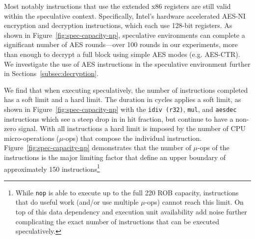 % 

Most notably instructions that use the extended x86 registers are still valid
within the speculative context. Specifically, Intel's hardware accelerated
AES-NI encryption and decryption instructions, which each use 128-bit registers.
As shown in Figure~\ref{fig:spec-capacity-np}, speculative environments can
complete a significant number of AES rounds---over 100 rounds in our
experiments, more than enough to decrypt a
full block using simple AES modes (e.g. AES-CTR). We investigate the use of AES
instructions in the speculative environment further in
Sections~\ref{subsec:decryption}.


We find that when executing speculatively, the number of instructions completed
has a soft limit and a hard limit. The duration in cycles applies a soft limit,
as shown in Figure~\ref{fig:spec-capacity-np} with the \texttt{idiv (r32)},
\texttt{mul}, and \texttt{aesdec} instructions which see a steep drop in in hit
fraction, but continue to have a non-zero signal.  With all instructions a hard
limit is imposed by the number of CPU micro-operations ($\mu$-ops) that compose
the individual instruction. Figure~\ref{fig:spec-capacity-np} demonstrates that
the number of $\mu$-ops of the instructions is the major limiting factor that
define an upper boundary of approximately 150 instructions\footnote{While
\texttt{nop} is able to execute up to the full 220 ROB capacity, instructions
that do useful work (and/or use multiple $\mu$-ops) cannot reach this limit. On
top of this data dependency and execution unit availability add noise further
complicating the exact number of instructions that can be executed
speculatively.}




